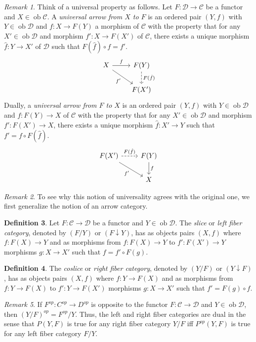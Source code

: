 \documentclass[10pt,letterpaper,cm]{nupset}
\theoremstyle{definition}
\newtheorem{definition}{Definition}
\theoremstyle{theorem}
\theoremstyle{remark}
\newtheorem{remark}[definition]{Remark}
\newcommand{\1}{\mathbf{1}}
\renewcommand{\c}{\mathscr{C}}
\renewcommand{\d}{\mathscr{D}}
\newcommand{\0}{\vec 0}
\DeclareMathOperator{\ob}{ob}
\begin{document}
\begin{remark}
Think of a universal property as follows.  Let $F : \d \to \c$ be a functor and $X \in \ob \c$. A \textit{universal arrow from $X$ to $F$} is an ordered pair $(Y, f)$ with $Y \in \ob \d$ and $f : X \to F(Y)$ a morphism of $\c$ with the property that for any $X' \in \ob \d$ and morphism $f' : X \to F(X')$ of $\c$, there exists a unique morphism $\hat{f} : Y \to X'$ of $\d$ such that $F(\hat{f}) \circ f = f'$.
\[ \begin{tikzcd}
X \arrow[r, "f"] \arrow[swap, dr,  " f' "] & F(Y) \arrow[d, dashed, "F(\hat{f})"] \\%
 & F(X')
\end{tikzcd}
\]
Dually, a \textit{universal arrow from $F$ to $X$} is an ordered pair $(Y, f)$ with $Y \in \ob \d$ and $f: F(Y) \to X$ of $\c$ with the property that for any $X' \in \ob \d$ and morphism $f' : F(X') \to X$, there exists a unique morphism $\hat{f}: X' \to Y$ such that $f' = f \circ F(\hat{f})$.
\[ \begin{tikzcd}
F(X') \arrow[r, dashed, "F(\hat{f})"] \arrow[swap, dr,  " f' "] & F(Y) \arrow[d, "f"] \\%
 & X
\end{tikzcd}
\]
\end{remark}

\begin{remark}
To see why this notion of universality agrees with the original one, we first generalize the notion of an arrow category.
\end{remark}

\begin{definition}
Let $F: \c \to \d$ be a functor and $Y \in \ob \d$. The \textit{slice} or \textit{left fiber category}, denoted by $(F/Y)$ or $(F \downarrow Y)$, has as objects pairs $(X, f)$ where $f: F(X) \to Y$ and as morphisms from $f : F(X) \to Y$ to $f' : F(X') \to Y$ morphisms $g : X \to X'$ such that $f = f' \circ F(g).$ 
\end{definition}

\begin{definition}
The \textit{coslice} or \textit{right fiber category}, denoted by $(Y/F)$ or $(Y \downarrow F)$, has as objects pairs $(X, f)$ where $f: Y\to F(X)$ and as morphisms from $f :  Y \to F(X)$ to $f' : Y \to F(X')$ morphisms $g : X \to X'$ such that $f' = F(g) \circ f.$

\end{definition}

\begin{remark}
If $F^{op}:C^{op} \to D^{op}$ is opposite to the functor $F: \c \to \d$ and $Y \in \ob \d$, then $(Y/F)^{op} = {F^{op}}/{Y}$. Thus, the left and right fiber categories are dual in the sense that $P(Y, F)$ is true for any right fiber category ${Y}/{F}$ iff $P^{op}(Y, F)$ is true for any left fiber category ${F}/{Y}$. 
\end{remark}
\end{document}
